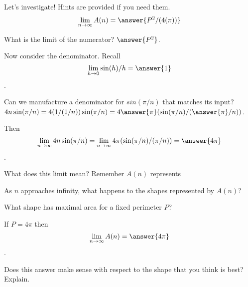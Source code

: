 \documentclass[handout,nooutcomes]{ximera}
\begin{document}
\medskip

\begin{exercise}
Let's investigate! Hints are provided if you need them.\\
\[\lim_{n \to \infty}A(n) = \answer{P^2/(4(\pi))}\]
\begin{hint}
	What is the limit of the numerator? $\answer{P^2}$.
\end{hint}
\begin{hint}
  Now consider the denominator. Recall \[\lim_{h \to 0} \sin(h)/h = \answer{1}\].
\end{hint}
\begin{hint}
  Can we manufacture a denominator for $sin(\pi/n)$ that matches its input?\\
  $4n\sin(\pi/n) = 4(1/(1/n))\sin(\pi/n) = 4\answer{\pi}(\sin(\pi/n)/(\answer{\pi}/n))$.
\end{hint}
\begin{hint}
  Then \[\lim_{n \to \infty} 4n\sin(\pi/n) = \lim_{n \to \infty} 4\pi(\sin(\pi/n)/(\pi/n)) = \answer{4\pi}\].
\end{hint}
\end{exercise}

What does this limit mean? Remember $A(n)$ represents
\begin{multipleChoice}
\end{multipleChoice}
\begin{freeResponse}
As $n$ approaches infinity, what happens to the shapes represented by $A(n)$?
\end{freeResponse}

What shape has maximal area for a fixed perimeter $P$?
\begin{multipleChoice}
\end{multipleChoice}

\bigskip

If $P = 4\pi$ then \[\lim_{n \to \infty} A(n) = \answer{4\pi}\].\\
\begin{freeResponse}
Does this answer make sense with respect to the shape that you think is best? Explain.
\end{freeResponse}
\end{document}
